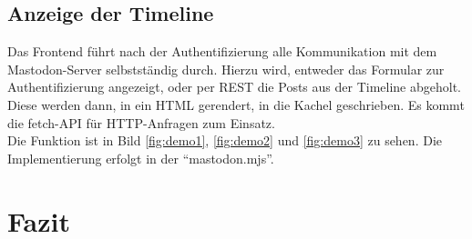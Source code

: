 \documentclass[fleqn,10pt]{SelfArx} %
\begin{document}
\subsection{Anzeige der Timeline}
Das Frontend führt nach der Authentifizierung alle Kommunikation mit dem Mastodon-Server selbstständig durch. Hierzu wird, entweder das Formular zur Authentifizierung angezeigt, oder per REST die Posts aus der Timeline abgeholt. Diese werden dann, in ein HTML gerendert, in die Kachel geschrieben. Es kommt die fetch-API für HTTP-Anfragen zum Einsatz. \\
Die Funktion ist in Bild \ref{fig:demo1}, \ref{fig:demo2} und \ref{fig:demo3} zu sehen. Die Implementierung erfolgt in der \enquote{mastodon.mjs}.
\section{Fazit}
\end{document}
